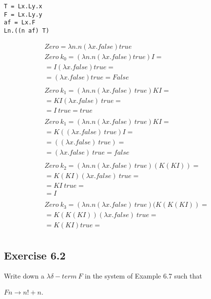 \documentclass[11pt]{article}
\begin{document}
\begin{verbatim}
T = Lx.Ly.x 
F = Lx.Ly.y
af = Lx.F
Ln.((n af) T)
\end{verbatim}

\begin{gather*}
Zero = \lambda n.n (\lambda x. false) true \\
Zero\ k_0 = (\lambda n.n (\lambda x. false) true) I = \\
= I (\lambda x. false) true = \\
= (\lambda x. false) true = False \\
\\
Zero\ k_1 = (\lambda n.n (\lambda x. false)\ true) KI = \\
= KI (\lambda x. false)\ true = \\
= I\ true = true \\
\\
Zero\ k_1 = (\lambda n.n (\lambda x. false)\ true) KI = \\
= K((\lambda x. false)\ true) I = \\
= ((\lambda x. false)\ true) = \\
= (\lambda x. false)\ true = false \\
\\
Zero\ k_2 = (\lambda n.n (\lambda x. false)\ true) (K(KI)) = \\
= K(KI)(\lambda x. false)\ true = \\
= KI\ true = \\
= I \\
\\
Zero\ k_3 = (\lambda n.n (\lambda x. false)\ true) (K(K(KI)) = \\
= K(K(KI)) (\lambda x. false)\ true = \\
= K(KI) true = \\
\end{gather*}

























\subsection{Exercise 6.2}
Write down a $\lambda \delta-term\ F$ in the system of Example 6.7 such that 
\begin{center} $Fn \rightarrow n! + n$. \\\end{center}
\end{document}
